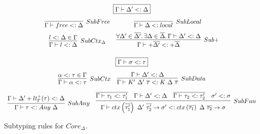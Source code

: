\documentclass[11pt]{article}
\newcommand{\mathframebox}[1]{\framebox{$\displaystyle #1$}}
\newcommand{\ap}{~}
\newcommand{\ctx}[1]{ctx\left(#1\right)~}
\begin{document}
    \begin{figure}
        \begin{gather*}
            \mathframebox{\Gamma\vdash\Delta' <: \Delta} \\[0.5em]
            \begin{array}{cc}
                \infer[SubFree]{\Gamma\vdash free <: \Delta}{} &
                \infer[SubLocal]{\Gamma\vdash\Delta <: local}{} \\[0.5em]
                \infer[SubCtx_\Delta]{
                    \Gamma\vdash l <: \Delta
                }{
                    l <: \Delta \in \Gamma
                } &
                \infer[Sub+]{
                    \Gamma\vdash+\overline{\Delta'} <: +\overline{\Delta}
                }{
                    \forall\Delta'\in\overline{\Delta'}\ldotp\exists\Delta\in\overline{\Delta}\ldotp \Gamma\vdash\Delta' <: \Delta
                }
            \end{array}\\[1em]
            \mathframebox{\Gamma\vdash \sigma <: \tau} \\[0.5em]
            \begin{array}{cc}
                \infer[SubCtx]{\Gamma\vdash \alpha <: \tau}{\alpha <: \tau \in \Gamma} &
                \infer[SubData]{
                    \Gamma\vdash K'\ap\Delta'\ap\overline{\tau} <: K\ap\Delta\ap\overline{\tau}
                }{
                    \Gamma\vdash\Delta' <: \Delta
                }
            \end{array} \\[0.5em]
            \begin{array}{cc}
                \infer[SubAny]{
                    \Gamma\vdash \tau <: Any\ap\Delta
                }{
                    \Gamma\vdash \Delta'+lt_\Gamma^+(\tau) <: \Delta
                } &
                \infer[SubFun]{
                    \Gamma\vdash\ctx{\overline{\tau_1'}}\Delta'~\overline{\tau_2'}\to\sigma' <: \ctx{\overline{\tau_1}}\Delta~\overline{\tau_2}\to\sigma
                }{
                    \overline{\Gamma\vdash\tau_1 <: \tau_1'} &
                    \Gamma\vdash\Delta' <: \Delta &
                    \overline{\Gamma\vdash\tau_2 <: \tau_2'} &
                    \sigma' <: \sigma
                }
            \end{array}
        \end{gather*}
        \caption{Subtyping rules for $Core_{\Delta}$.}
        \label{fig:core-subtyping}
    \end{figure}
\end{document}
